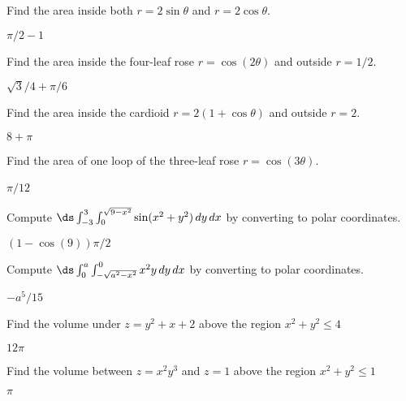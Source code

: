 \begin{enumialphparenastyle}
\begin{ex}
Find the area inside both
$r=2\sin\theta$ and $r=2\cos\theta$. 
\begin{sol}
$\pi/2-1$
\end{sol}
\end{ex}

\begin{ex}
Find the area inside the four-leaf rose $r=\cos(2\theta)$
and outside $r=1/2$.
\begin{sol}
$\sqrt3/4+\pi/6$
\end{sol}
\end{ex}

\begin{ex}
Find the area inside the cardioid $r=2(1+\cos\theta)$
and outside $r=2$.
\begin{sol}
$8+\pi$
\end{sol}
\end{ex}

\begin{ex}\label{ex:areaofthreeleafroseloop}
Find the area of one loop of the three-leaf rose
 $r=\cos(3\theta)$.
\begin{sol}
$\pi/12$\
\end{sol}
\end{ex}

\begin{ex}
Compute $\ds \int_{-3}^3\int_0^{\sqrt{9-x^2}}
\sin(x^2+y^2)\,dy\,dx$ by converting to polar coordinates.
\begin{sol}
$(1-\cos(9))\pi/2$
\end{sol}
\end{ex}

\begin{ex}
Compute $\ds \int_{0}^a\int_{-\sqrt{a^2-x^2}}^0 x^2y\,dy\,dx$ 
by converting to polar coordinates.
\begin{sol}
$-a^5/15$
\end{sol}
\end{ex}

\begin{ex}
Find the volume under $z=y^2+x+2$ above
the region $x^2+y^2\le 4$
\begin{sol}
$12\pi$
\end{sol}
\end{ex}

\begin{ex}
Find the volume between
$z=x^2y^3$ and $z=1$ above
the region $x^2+y^2\le 1$
\begin{sol}
$\pi$
\end{sol}
\end{ex}


\end{enumialphparenastyle}
